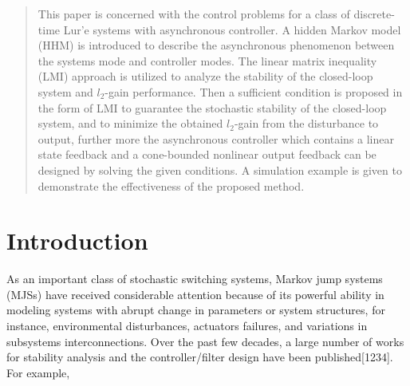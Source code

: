 \documentclass[conference]{IEEEtran}
\begin{document}




\maketitle

\begin{abstract}
	This paper is concerned with the control problems for a class of discrete-time Lur'e systems with asynchronous controller. A hidden Markov model (HHM) is introduced to describe the asynchronous phenomenon between the systems mode and controller modes. The linear matrix inequality (LMI) approach is utilized to analyze the stability of the closed-loop system and $l_2$-gain performance.  Then a sufficient condition is proposed in the form of LMI to guarantee the stochastic stability of the closed-loop system, and to minimize the obtained $l_2$-gain from the disturbance to output, further more the asynchronous controller which contains a linear state feedback and a cone-bounded nonlinear output feedback can be designed by solving the given conditions. A simulation example is given to demonstrate the effectiveness of the proposed method. 
\end{abstract}





%
\IEEEpeerreviewmaketitle
  
   

\section{Introduction}
	As an important class of stochastic switching systems, Markov jump systems (MJSs) have received considerable attention because of its powerful ability in modeling systems with abrupt change in parameters or system structures, for instance,  environmental disturbances, actuators failures, and variations in subsystems interconnections. Over the past few decades, a large number of works for stability analysis and the controller/filter design have been published[1234]. For example,    
	
\end{document}

